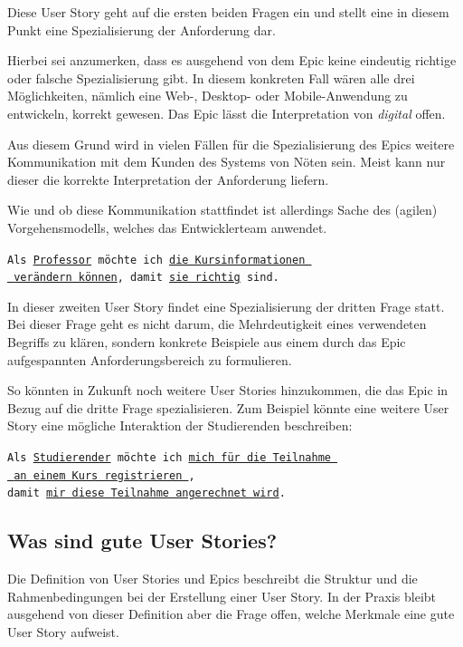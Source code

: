 \documentclass[acmtog]{acmart}
\begin{document}
Diese User Story geht auf die ersten beiden Fragen ein und stellt eine in diesem Punkt
eine Spezialisierung der Anforderung dar.

Hierbei sei anzumerken, dass es ausgehend von dem Epic keine eindeutig richtige oder
falsche Spezialisierung gibt.
In diesem konkreten Fall wären alle drei Möglichkeiten,
nämlich eine Web-, Desktop- oder Mobile-Anwendung zu entwickeln, korrekt gewesen.
Das Epic lässt die Interpretation von \emph{digital} offen.

Aus diesem Grund wird in vielen Fällen für die Spezialisierung des Epics weitere Kommunikation
mit dem Kunden des Systems von Nöten sein.
Meist kann nur dieser die korrekte Interpretation der Anforderung liefern.

Wie und ob diese Kommunikation stattfindet ist allerdings Sache des (agilen) Vorgehensmodells, welches
das Entwicklerteam anwendet.

\vspace{1em}
\texttt{Als \underline{Professor} möchte ich \underline{die Kursinformationen }\\
	\hspace*{4.5em} \underline{ verändern können}, damit \underline{sie richtig} sind.}
\vspace{1em}

In dieser zweiten User Story findet eine Spezialisierung der dritten Frage statt.
Bei dieser Frage geht es nicht darum, die Mehrdeutigkeit eines verwendeten Begriffs zu klären,
sondern konkrete Beispiele aus einem durch das Epic aufgespannten Anforderungsbereich
zu formulieren.

So könnten in Zukunft noch weitere User Stories hinzukommen, die das Epic in Bezug auf die dritte
Frage spezialisieren.
Zum Beispiel könnte eine weitere User Story eine mögliche Interaktion der Studierenden beschreiben:

\vspace{1em}
\texttt{Als \underline{Studierender} möchte ich \underline{mich für die Teilnahme }\\
	\hspace*{2em}\underline{ an einem Kurs registrieren },\\
	\hspace*{4em}damit \underline{mir diese Teilnahme angerechnet wird}.}
\vspace{1em}

\subsection{Was sind gute User Stories?}
Die Definition von User Stories und Epics beschreibt die Struktur und die Rahmenbedingungen bei der Erstellung einer User Story.
In der Praxis bleibt ausgehend von dieser Definition aber die Frage offen, welche Merkmale eine gute User Story aufweist.
\end{document}
